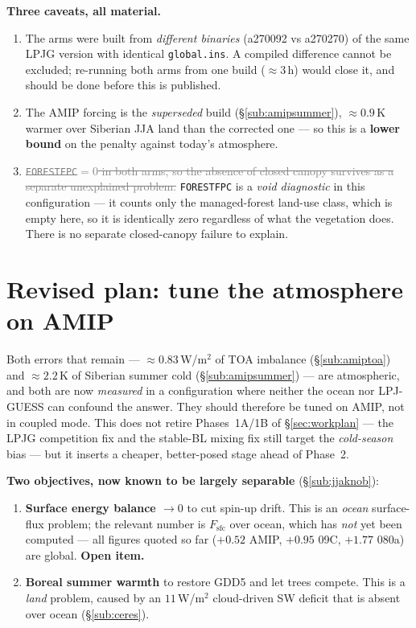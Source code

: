 \documentclass[10pt]{article}
\newcommand{\dead}[1]{\textcolor{gray}{\sout{#1}}}
\begin{document}
\textbf{Three caveats, all material.}
\begin{enumerate}\itemsep1pt
\item The arms were built from \emph{different binaries} (a270092 vs a270270) of the same LPJG version with
identical \texttt{global.ins}. A compiled difference cannot be excluded; re-running both arms from one build
($\approx3$\,h) would close it, and should be done before this is published.
\item The AMIP forcing is the \emph{superseded} build (\S\ref{sub:amipsummer}), $\approx0.9$\,K warmer over
Siberian JJA land than the corrected one --- so this is a \textbf{lower bound} on the penalty against today's
atmosphere.
\item \dead{\texttt{FORESTFPC}$=0$ in both arms, so the absence of closed canopy survives as a separate
unexplained problem.} \texttt{FORESTFPC} is a \emph{void diagnostic} in this configuration --- it counts only
the managed-forest land-use class, which is empty here, so it is identically zero regardless of what the
vegetation does. There is no separate closed-canopy failure to explain.
\end{enumerate}

\section{Revised plan: tune the atmosphere on AMIP}\label{sec:amipplan}
Both errors that remain --- $\approx0.83$\,W/m$^2$ of TOA imbalance (\S\ref{sub:amiptoa}) and
$\approx2.2$\,K of Siberian summer cold (\S\ref{sub:amipsummer}) --- are atmospheric, and both are now
\emph{measured} in a configuration where neither the ocean nor LPJ-GUESS can confound the answer. They should
therefore be tuned on AMIP, not in coupled mode. This does not retire Phases~1A/1B of \S\ref{sec:workplan}
--- the LPJG competition fix and the stable-BL mixing fix still target the \emph{cold-season} bias --- but it
inserts a cheaper, better-posed stage ahead of Phase~2.

\textbf{Two objectives, now known to be largely separable} (\S\ref{sub:jjaknob}):
\begin{enumerate}\itemsep1pt
\item \textbf{Surface energy balance $\to0$} to cut spin-up drift. This is an \emph{ocean} surface-flux
problem; the relevant number is $F_\mathrm{sfc}$ over ocean, which has \emph{not} yet been computed --- all
figures quoted so far ($+0.52$ AMIP, $+0.95$ 09C, $+1.77$ 080a) are global. \textbf{Open item.}
\item \textbf{Boreal summer warmth} to restore GDD5 and let trees compete. This is a \emph{land} problem,
caused by an $11$\,W/m$^2$ cloud-driven SW deficit that is absent over ocean (\S\ref{sub:ceres}).
\end{enumerate}
\end{document}
